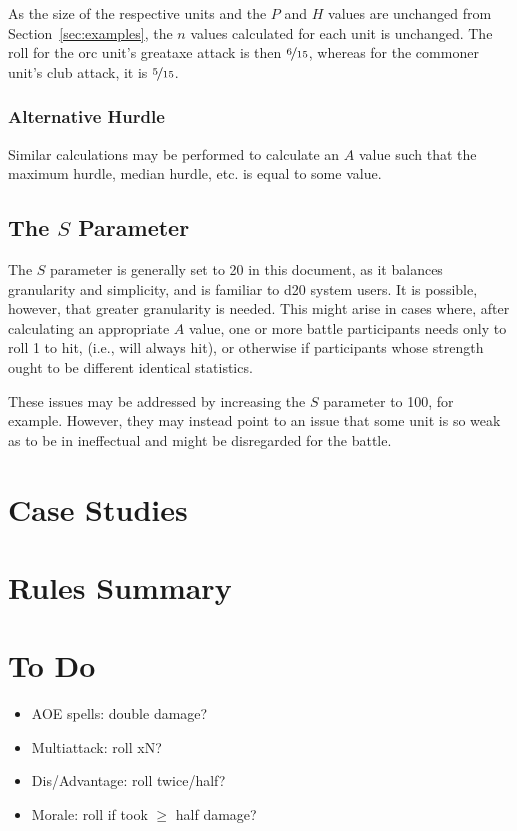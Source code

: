 \documentclass[twocolumn]{article}
\begin{document}
As the size of the respective units and the $P$ and $H$ values
are unchanged from Section~\ref{sec:examples},
the $n$ values calculated for each unit is unchanged.
The roll for the orc unit's greataxe attack is then $\nicefrac{6}{15}$,
whereas for the commoner unit's club attack, it is $\nicefrac{5}{15}$.

\subsubsection{Alternative Hurdle}

Similar calculations may be performed to calculate an $A$ value
such that the maximum hurdle, median hurdle, etc.
is equal to some value.

\subsection{The $S$ Parameter}
The $S$ parameter is generally set to 20 in this document,
as it balances granularity and simplicity,
and is familiar to d20 system users.
It is possible, however, that greater granularity is needed.
This might arise in cases where,
after calculating an appropriate $A$ value,
one or more battle participants needs only to roll 1 to hit,
(i.e., will always hit),
or otherwise if participants whose strength ought to be different
identical statistics.

These issues may be addressed by increasing the $S$ parameter to 100,
for example.
However, they may instead point to an issue that some unit
is so weak as to be in ineffectual and might be disregarded for the battle.

\section{Case Studies}

\section{Rules Summary}

\section{To Do}
\begin{itemize}
    \item AOE spells: double damage?
    \item Multiattack: roll xN?
    \item Dis/Advantage: roll twice/half?
    \item Morale: roll if took $\geq$ half damage?
\end{itemize}
\end{document}
